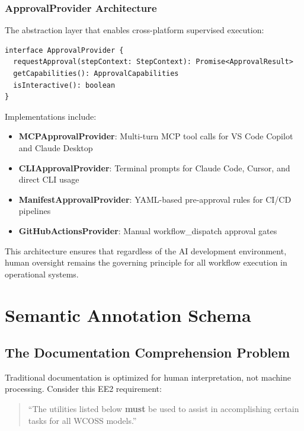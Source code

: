 \documentclass[11pt,letterpaper]{article}
\begin{document}
\subsubsection{ApprovalProvider Architecture}

The abstraction layer that enables cross-platform supervised execution:

\begin{lstlisting}[style=code, caption={ApprovalProvider Interface}]
interface ApprovalProvider {
  requestApproval(stepContext: StepContext): Promise<ApprovalResult>
  getCapabilities(): ApprovalCapabilities
  isInteractive(): boolean
}
\end{lstlisting}

Implementations include:
\begin{itemize}
    \item \textbf{MCPApprovalProvider}: Multi-turn MCP tool calls for VS Code Copilot and Claude Desktop
    \item \textbf{CLIApprovalProvider}: Terminal prompts for Claude Code, Cursor, and direct CLI usage
    \item \textbf{ManifestApprovalProvider}: YAML-based pre-approval rules for CI/CD pipelines
    \item \textbf{GitHubActionsProvider}: Manual workflow\_dispatch approval gates
\end{itemize}

This architecture ensures that regardless of the AI development environment, human oversight remains the governing principle for all workflow execution in operational systems.

\section{Semantic Annotation Schema}

\subsection{The Documentation Comprehension Problem}

Traditional documentation is optimized for human interpretation, not machine processing. Consider this EE2 requirement:

\begin{quote}
    ``The utilities listed below \textbf{must} be used to assist in accomplishing certain tasks for all WCOSS models.''
\end{quote}
\end{document}
